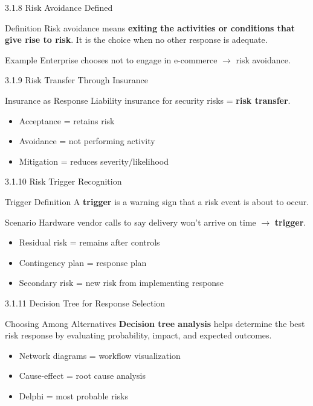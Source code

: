 \documentclass{beamer}
\begin{document}
	\begin{frame}{3.1.8 Risk Avoidance Defined}
		\begin{block}{Definition}
			Risk avoidance means \textbf{exiting the activities or conditions that give rise to risk}. It is the choice when no other response is adequate.
		\end{block}
		\begin{exampleblock}{Example}
			Enterprise chooses not to engage in e-commerce $\rightarrow$ risk avoidance.
		\end{exampleblock}
	\end{frame}
	
	\begin{frame}{3.1.9 Risk Transfer Through Insurance}
		\begin{block}{Insurance as Response}
			Liability insurance for security risks = \textbf{risk transfer}.
		\end{block}
		\begin{itemize}
			\item Acceptance = retains risk
			\item Avoidance = not performing activity
			\item Mitigation = reduces severity/likelihood
		\end{itemize}
	\end{frame}
	
	\begin{frame}{3.1.10 Risk Trigger Recognition}
		\begin{block}{Trigger Definition}
			A \textbf{trigger} is a warning sign that a risk event is about to occur.
		\end{block}
		\begin{exampleblock}{Scenario}
			Hardware vendor calls to say delivery won't arrive on time $\rightarrow$ \textbf{trigger}.
		\end{exampleblock}
		\begin{itemize}
			\item Residual risk = remains after controls
			\item Contingency plan = response plan
			\item Secondary risk = new risk from implementing response
		\end{itemize}
	\end{frame}
	
	\begin{frame}{3.1.11 Decision Tree for Response Selection}
		\begin{block}{Choosing Among Alternatives}
			\textbf{Decision tree analysis} helps determine the best risk response by evaluating probability, impact, and expected outcomes.
		\end{block}
		\begin{itemize}
			\item Network diagrams = workflow visualization
			\item Cause-effect = root cause analysis
			\item Delphi = most probable risks
		\end{itemize}
	\end{frame}
	
\end{document}
